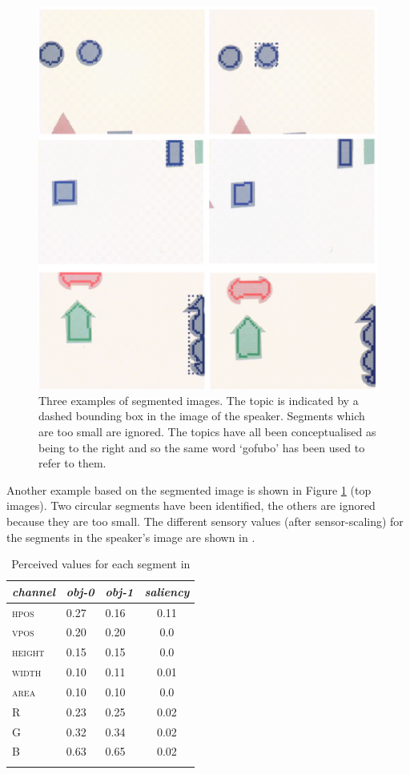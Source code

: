 \begin{figure}[hbtp]
\begin{center}
\includegraphics[width=0.8\columnwidth]{chap7/figs/plate-10.pdf}
\end{center}
\caption{Three examples of segmented images. The 
topic is indicated by a dashed bounding box in the 
image of the speaker. Segments which are too small 
are ignored. The topics have all been conceptualised
as being to the right and so the same word 
`gofubo' has been used to refer to them. }
\label{f:plate-10}
\end{figure}

Another example based on the segmented image is shown in Figure 
\ref{f:plate-10} (top images). Two circular segments
have been identified, the others are ignored because they are 
too small. The different sensory values (after sensor-scaling)
for the segments in the speaker's image are shown in . 


\begin{table}[t]
\begin{center}
\begin{tabular}{  l   l   l   c  } \lsptoprule
{\itshape channel}& {\itshape obj-0} & {\itshape obj-1} & {\itshape saliency}\\ \midrule
\textsc{hpos} & 0.27 & 0.16 & 0.11\\ 
\textsc{vpos} & 0.20 & 0.20 & 0.0\\ 
\textsc{height} & 0.15 & 0.15 & 0.0\\ 
\textsc{width} & 0.10 & 0.11 & 0.01\\ 
\textsc{area} & 0.10 & 0.10 & 0.0\\ 
R & 0.23 & 0.25 & 0.02\\ 
G & 0.32 & 0.34 & 0.02\\ 
B & 0.63 & 0.65 & 0.02\\ 
\lspbottomrule
\end{tabular}
\caption{Perceived values for each segment in 
\label{tab:t-plate10}}
\end{center}
\end{table}

